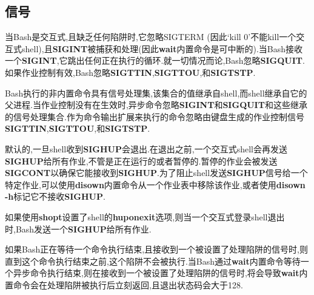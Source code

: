 \documentclass[draft,openany]{book}
\begin{document}
\begin{CJK}{UTF8}{gbsn}
    \subsection{信号}
    当Bash是交互式,且缺乏任何陷阱时,它忽略SIGTERM (因此`kill 0'不能kill一个交互式shell),且\textbf{SIGINT}被捕获和处理(因此\textbf{wait}内置命令是可中断的).当Bash接收一个\textbf{SIGINT},它跳出任何正在执行的循环.就一切情况而论,Bash忽略\textbf{SIGQUIT}.如果作业控制有效,Bash忽略\textbf{SIGTTIN},\textbf{SIGTTOU},和\textbf{SIGTSTP}.\par
    Bash执行的非内置命令具有信号处理集,该集合的值继承自shell,而shell继承自它的父进程.当作业控制没有在生效时,异步命令忽略\textbf{SIGINT}和\textbf{SIGQUIT}和这些继承的信号处理集合.作为命令输出扩展来执行的命令忽略由键盘生成的作业控制信号\textbf{SIGTTIN},\textbf{SIGTTOU},和\textbf{SIGTSTP}.\par
    默认的,一旦shell收到\textbf{SIGHUP}会退出.在退出之前,一个交互式shell会再发送\textbf{SIGHUP}给所有作业,不管是正在运行的或者暂停的.暂停的作业会被发送\textbf{SIGCONT}以确保它能接收到\textbf{SIGHUP}.为了阻止shell发送\textbf{SIGHUP}信号给一个特定作业,可以使用\textbf{disown}内置命令从一个作业表中移除该作业,或者使用\textbf{disown -h}标记它不接收\textbf{SIGHUP}.\par
    如果使用\textbf{shopt}设置了shell的\textbf{huponexit}选项,则当一个交互式登录shell退出时,Bash发送一个\textbf{SIGHUP}给所有作业.\par
    如果Bash正在等待一个命令执行结束,且接收到一个被设置了处理陷阱的信号时,则直到这个命令执行结束之前,这个陷阱不会被执行.当Bash通过\textbf{wait}内置命令等待一个异步命令执行结束,则在接收到一个被设置了处理陷阱的信号时,将会导致\textbf{wait}内置命令会在处理陷阱被执行后立刻返回,且退出状态码会大于128.


\end{CJK}
\end{document}
